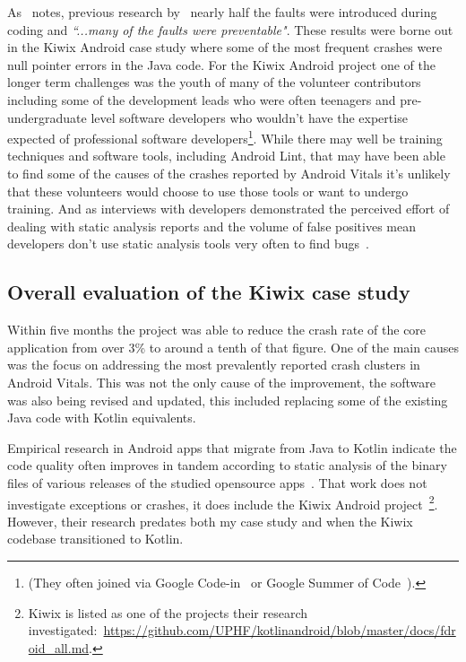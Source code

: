 As~\citep{kidwell2015_toward_fault_taxonomy_application_of_software_analytics} notes, previous research by~\citep{weider1998_software_fault_prevention_in_coding_and_RCA} nearly half the faults were introduced during coding and \emph{``...many of the faults were preventable"}. These results were borne out in the Kiwix Android case study where some of the most frequent crashes were null pointer errors in the Java code. For the Kiwix Android project one of the longer term challenges was the youth of many of the volunteer contributors including some of the development leads who were often teenagers and pre-undergraduate level software developers who wouldn't have the expertise expected of professional software developers\footnote{(They often joined via Google Code-in~\citep{google_code_in_archive} or Google Summer of Code~\citep{google_summer_of_code}).}. While there may well be training techniques and software tools, including Android Lint, that may have been able to find some of the causes of the crashes reported by Android Vitals it's unlikely that these volunteers would choose to use those tools or want to undergo training. And as interviews with developers demonstrated the perceived effort of dealing with static analysis reports and the volume of false positives mean developers don't use static analysis tools very often to find bugs~\citep{johnson2013_why_dont_devs_use_static_analysis}.

\subsection{Overall evaluation of the Kiwix case study}
Within five months the project was able to reduce the crash rate of the core application from over 3\% to around a tenth of that figure. One of the main causes was the focus on addressing the most prevalently reported crash clusters in Android Vitals. This was not the only cause of the improvement, the software was also being revised and updated, this included replacing some of the existing Java code with Kotlin equivalents. 

Empirical research in Android apps that migrate from Java to Kotlin indicate the code quality often improves in tandem according to static analysis of the binary files of various releases of the studied opensource apps~\cite{GoisMateus2019_an_empirical_study_on_the_quality_of_android_apps_in_kotlin}. That work does not investigate exceptions or crashes, it does include the Kiwix Android project~\footnote{Kiwix is listed as one of the projects their research investigated:~\url{https://github.com/UPHF/kotlinandroid/blob/master/docs/fdroid_all.md}.}. However, their research predates both my case study and when the Kiwix codebase transitioned to Kotlin.

